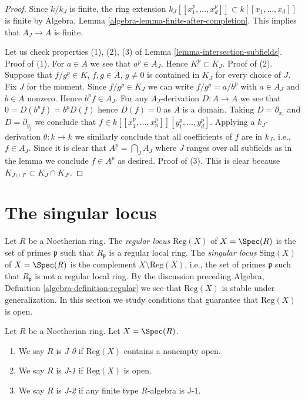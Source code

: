 \begin{proof}
Since $k/k_J$ is finite, the ring extension
$k_J[[x_1^p, \ldots, x_d^p]] \subset k[[x_1, \ldots, x_d]]$ is finite
by Algebra, Lemma \ref{algebra-lemma-finite-after-completion}.
This implies that $A_J \to A$ is finite.

\medskip\noindent
Let us check properties (1), (2), (3) of
Lemma \ref{lemma-intersection-subfields}.
Proof of (1). For $a \in A$ we see that $a^p \in A_J$.
Hence $K^p \subset K_J$. Proof of (2).
Suppose that $f/g^p \in K$, $f, g \in A$, $g \not = 0$
is contained in $K_J$ for every choice of $J$.
Fix $J$ for the moment. Since $f/g^p \in K_J$ we can write
$f/g^p = a/b^p$ with $a \in A_J$ and $b \in A$ nonzero.
Hence $b^p f \in A_J$. For any $A_J$-derivation $D : A \to A$ we see
that $0 = D(b^pf) = b^p D(f)$ hence $D(f) = 0$ as $A$ is a domain.
Taking $D = \partial_{x_i}$ and $D = \partial_{y_j}$ we conclude
that $f \in k[[x_1^p, \ldots, x_n^p]][y_1^p, \ldots, y_d^p]$.
Applying a $k_J$-derivation $\theta : k \to k$
we similarly conclude that all coefficients of $f$
are in $k_J$, i.e., $f \in A_J$. Since it is clear that
$A^p = \bigcap\nolimits_J A_J$ where $J$ ranges over all subfields
as in the lemma we conclude $f \in A^p$ as desired.
Proof of (3). This is clear because $K_{J \cup J'} \subset K_J \cap K_{J'}$.
\end{proof}





\section{The singular locus}
\label{section-singular-locus}

\noindent
Let $R$ be a Noetherian ring. The {\it regular locus} $\text{Reg}(X)$
of $X = \Spec(R)$ is the set of primes $\mathfrak p$ such that
$R_\mathfrak p$ is a regular local ring. The {\it singular locus}
$\text{Sing}(X)$ of $X = \Spec(R)$ is the complement
$X \setminus \text{Reg}(X)$, i.e., the set of primes $\mathfrak p$ such that
$R_\mathfrak p$ is not a regular local ring. By the discussion preceding
Algebra, Definition \ref{algebra-definition-regular}
we see that $\text{Reg}(X)$ is stable under generalization.
In this section we study conditions that guarantee that $\text{Reg}(X)$
is open.

\begin{definition}
\label{definition-J}
\begin{reference}
\cite[(32.B)]{MatCA}
\end{reference}
Let $R$ be a Noetherian ring. Let $X = \Spec(R)$.
\begin{enumerate}
\item We say $R$ is {\it J-0} if $\text{Reg}(X)$ contains a nonempty open.
\item We say $R$ is {\it J-1} if $\text{Reg}(X)$ is open.
\item We say $R$ is {\it J-2} if any finite type $R$-algebra is J-1.
\end{enumerate}
\end{definition}

